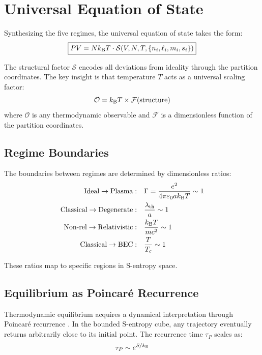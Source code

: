 \section{Universal Equation of State}
\label{sec:eos}

Synthesizing the five regimes, the universal equation of state takes the form:
\begin{equation}
\boxed{PV = Nk_{\mathrm{B}} T \cdot \mathcal{S}(V, N, T, \{n_i, \ell_i, m_i, s_i\})}
\label{eq:universal}
\end{equation}

The structural factor $\mathcal{S}$ encodes all deviations from ideality through the partition coordinates. The key insight is that temperature $T$ acts as a universal scaling factor:
\begin{equation}
\mathcal{O} = k_{\mathrm{B}} T \times \mathcal{F}(\text{structure})
\end{equation}
where $\mathcal{O}$ is any thermodynamic observable and $\mathcal{F}$ is a dimensionless function of the partition coordinates.

\subsection{Regime Boundaries}

The boundaries between regimes are determined by dimensionless ratios:
\begin{align}
\text{Ideal} \to \text{Plasma}: \quad & \Gamma = \frac{e^2}{4\pi\varepsilon_0 ak_{\mathrm{B}} T} \sim 1 \\
\text{Classical} \to \text{Degenerate}: \quad & \frac{\lambda_{\text{th}}}{a} \sim 1 \\
\text{Non-rel} \to \text{Relativistic}: \quad & \frac{k_{\mathrm{B}} T}{mc^2} \sim 1 \\
\text{Classical} \to \text{BEC}: \quad & \frac{T}{T_c} \sim 1
\end{align}

These ratios map to specific regions in S-entropy space.

\subsection{Equilibrium as Poincar\'{e} Recurrence}

Thermodynamic equilibrium acquires a dynamical interpretation through Poincar\'{e} recurrence \cite{poincare1890probleme, cornfeld1982ergodic}. In the bounded S-entropy cube, any trajectory eventually returns arbitrarily close to its initial point. The recurrence time $\tau_P$ scales as:
\begin{equation}
\tau_P \sim e^{S/k_{\mathrm{B}}}
\end{equation}

